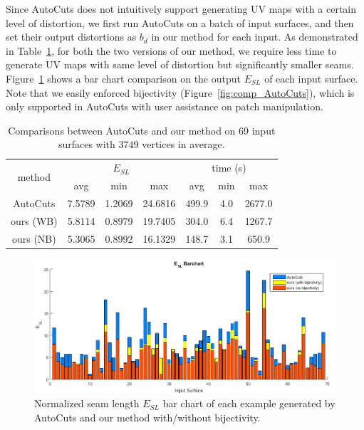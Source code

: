 Since AutoCuts does not intuitively support generating UV maps with a certain level of distortion, we first run AutoCuts on a batch of input surfaces, and then set their output distortions as $b_d$ in our method for each input. As demonstrated in Table~\ref{tb:comp_AutoCuts}, for both the two versions of our method, we require less time to generate UV maps with same level of distortion but significantly smaller seams. Figure~\ref{fig:ESLBar_compAutoCuts} shows a bar chart comparison on the output $E_{SL}$ of each input surface. Note that we easily enforced bijectivity (Figure~\ref{fig:comp_AutoCuts}), which is only supported in AutoCuts with user assistance on patch manipulation.

\begin{table}[!h]
\centering
\caption{Comparisons between AutoCuts and our method on 69 input surfaces with $3749$ vertices in average.}
\label{tb:comp_AutoCuts}
\begin{tabular}{|c|ccc|ccc|}
\hline
\multirow{2}{*}{method} & \multicolumn{3}{c|}{$E_{SL}$} & \multicolumn{3}{c|}{time (s)} \\ \cline{2-7} 
                        & avg      & min     & max      & avg      & min    & max       \\ \hline
AutoCuts                & 7.5789   & 1.2069  & 24.6816  & 499.9    & 4.0    & 2677.0    \\
ours (WB)               & 5.8114   & 0.8979  & 19.7405  & 304.0    & 6.4    & 1267.7     \\
ours (NB)               & 5.3065   & 0.8992  & 16.1329  & 148.7    & 3.1    & 650.9    \\ \hline
\end{tabular}
\end{table}

\begin{figure}[!h]
\centering
\includegraphics[width=\linewidth]{fig/ESLBar_compAutoCuts.png}
\caption{Normalized seam length $E_{SL}$ bar chart of each example generated by AutoCuts and our method with/without bijectivity.}
\label{fig:ESLBar_compAutoCuts}
\end{figure}

